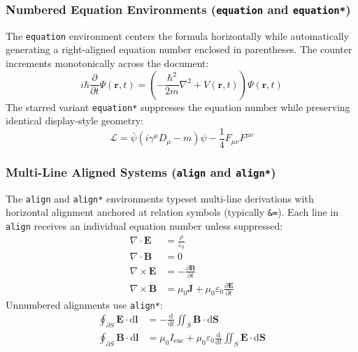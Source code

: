 \documentclass[11pt, a4paper]{article}
\begin{document}
\subsubsection{Numbered Equation Environments (\texttt{equation} and \texttt{equation*})}
The \texttt{equation} environment centers the formula horizontally while automatically generating a right-aligned equation number enclosed in parentheses. The counter increments monotonically across the document:
\begin{equation}
i \hbar \frac{\partial}{\partial t} \Psi(\mathbf{r}, t) = \left( -\frac{\hbar^2}{2m} \nabla^2 + V(\mathbf{r}, t) \right) \Psi(\mathbf{r}, t)
\end{equation}
The starred variant \texttt{equation*} suppresses the equation number while preserving identical display-style geometry:
\begin{equation*}
\mathcal{L} = \bar{\psi} (i \gamma^\mu D_\mu - m) \psi - \frac{1}{4} F_{\mu\nu} F^{\mu\nu}
\end{equation*}

\subsubsection{Multi-Line Aligned Systems (\texttt{align} and \texttt{align*})}
The \texttt{align} and \texttt{align*} environments typeset multi-line derivations with horizontal alignment anchored at relation symbols (typically \verb|&=|). Each line in \texttt{align} receives an individual equation number unless suppressed:
\begin{align}
\nabla \cdot \mathbf{E} &= \frac{\rho}{\varepsilon_0} \\
\nabla \cdot \mathbf{B} &= 0 \\
\nabla \times \mathbf{E} &= -\frac{\partial \mathbf{B}}{\partial t} \\
\nabla \times \mathbf{B} &= \mu_0 \mathbf{J} + \mu_0 \varepsilon_0 \frac{\partial \mathbf{E}}{\partial t}
\end{align}
Unnumbered alignments use \texttt{align*}:
\begin{align*}
\oint_{\partial S} \mathbf{E} \cdot \mathrm{d}\mathbf{l} &= -\frac{\mathrm{d}}{\mathrm{d}t} \iint_S \mathbf{B} \cdot \mathrm{d}\mathbf{S} \\
\oint_{\partial S} \mathbf{B} \cdot \mathrm{d}\mathbf{l} &= \mu_0 I_{\text{enc}} + \mu_0 \varepsilon_0 \frac{\mathrm{d}}{\mathrm{d}t} \iint_S \mathbf{E} \cdot \mathrm{d}\mathbf{S}
\end{align*}
\end{document}
